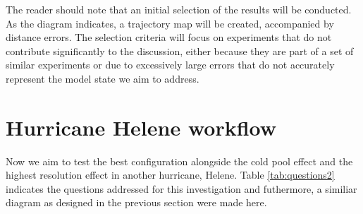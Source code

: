 The reader should note that an initial selection of the results will be conducted. As the diagram indicates, a trajectory map will be created, accompanied by distance errors. The selection criteria will focus on experiments that do not contribute significantly to the discussion, either because they are part of a set of similar experiments or due to excessively large errors that do not accurately represent the model state we aim to address.

\section{Hurricane Helene workflow}

Now we aim to test the best configuration alongside the cold pool effect and the highest resolution effect in another hurricane, Helene. Table \ref{tab:questions2} indicates the questions addressed for this investigation and futhermore, a similiar diagram as designed in the previous section were made here.

